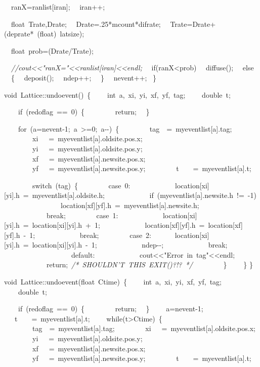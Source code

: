 {\ \ ranX=ranlist[iran];
\ \ iran++;

\ \ float\ Trate,Drate;
\ \ Drate=.25*mcount*difrate;
\ \ Trate=Drate+(deprate*\ (float)\ latsize);

\ \ float\ prob=(Drate/Trate);

\ \ \textsl{//cout<{}<{}"{}ranX="{}<{}<{}ranlist[iran]<{}<{}endl;}
\ \ if(ranX<{}prob)
\ \ diffuse();
\ \ else
\ \ \{
\ \ deposit();
\ \ ndep++;
\ \ \}
\ \ nevent++;
\
\}

void\ Lattice::undoevent()\ \{
\ \ \ \ int\ a,\ xi,\ yi,\ xf,\ yf,\ tag;
\ \ \ \ double\ t;

\ \ \ \ if\ (redoflag\ ==\ 0)\ \{
\ \ \ \ \ \ \ \ return;
\ \ \}

\ \ \ \ for\ (a=nevent-{}1;\ a\ >{}=0;\ a-{}-{})\ \{
\ \ \ \ \ \ \ \ tag\ \ =\ myeventlist[a].tag;
\ \ \ \ \ \ \ \ xi\ \ \ =\ myeventlist[a].oldsite.pos.x;
\ \ \ \ \ \ \ \ yi\ \ \ =\ myeventlist[a].oldsite.pos.y;
\ \ \ \ \ \ \ \ xf\ \ \ =\ myeventlist[a].newsite.pos.x;
\ \ \ \ \ \ \ \ yf\ \ \ =\ myeventlist[a].newsite.pos.y;
\ \ \ \ \ \ \ \ t\ \ \ \ =\ myeventlist[a].t;

\ \ \ \ \ \ \ \ switch\ (tag)\ \{
\ \ \ \ \ \ \ \ case\ 0:
\ \ \ \ \ \ \ \ \ \ \ \ location[xi][yi].h\ =\ myeventlist[a].oldsite.h;
\ \ \ \ \ \ \ \ \ \ \ \ if\ (myeventlist[a].newsite.h\ !=\ -{}1)
\ \ \ \ \ \ \ \ \ \ \ \ \ \ \ \ location[xf][yf].h\ =\ myeventlist[a].newsite.h;
\ \ \ \ \ \ \ \ \ \ \ \ break;
\ \ \ \ \ \ \ \ case\ 1:
\ \ \ \ \ \ \ \ \ \ \ \ location[xi][yi].h\ =\ location[xi][yi].h\ +\ 1;
\ \ \ \ \ \ \ \ \ \ \ \ location[xf][yf].h\ =\ location[xf][yf].h\ -{}\ 1;
\ \ \ \ \ \ \ \ \ \ \ \ break;
\ \ \ \ \ \ \ \ case\ 2:
\ \ \ \ \ \ location[xi][yi].h\ =\ location[xi][yi].h\ -{}\ 1;
\ \ \ \ \ \ \ \ \ \ \ \ ndep-{}-{};
\ \ \ \ \ \ \ \ \ \ \ \ break;
\ \ \ \ \ \ \ \ \ \ \
\ \ \ \ \ \ \ \ default:
\ \ \ \ \ \ \ \ \ \ \ \ cout<{}<{}"{}Error\ in\ tag"{}<{}<{}endl;
\ \ \ \ \ \ \ \ \ \ \ \ return;\ \textsl{/*\ SHOULDN'T\ THIS\ EXIT()?!?\ */}
\ \ \ \ \ \ \ \ \}
\ \ \ \ \}
\}

void\ Lattice::undoevent(float\ Ctime)\ \{
\ \ \ \ int\ a,\ xi,\ yi,\ xf,\ yf,\ tag;
\ \ \ \ double\ t;

\ \ \ \ if\ (redoflag\ ==\ 0)\ \{
\ \ \ \ \ \ \ \ return;
\ \ \}
\ \ \ \ a=nevent-{}1;
\ \ \ t\ \ \ \ =\ myeventlist[a].t;
\ \ \ \ while(t>{}Ctime)\ \{
\ \ \ \ \ \ \ \ tag\ \ =\ myeventlist[a].tag;
\ \ \ \ \ \ \ \ xi\ \ \ =\ myeventlist[a].oldsite.pos.x;
\ \ \ \ \ \ \ \ yi\ \ \ =\ myeventlist[a].oldsite.pos.y;
\ \ \ \ \ \ \ \ xf\ \ \ =\ myeventlist[a].newsite.pos.x;
\ \ \ \ \ \ \ \ yf\ \ \ =\ myeventlist[a].newsite.pos.y;
\ \ \ \ \ \ \ \ t\ \ \ \ =\ myeventlist[a].t;

}
